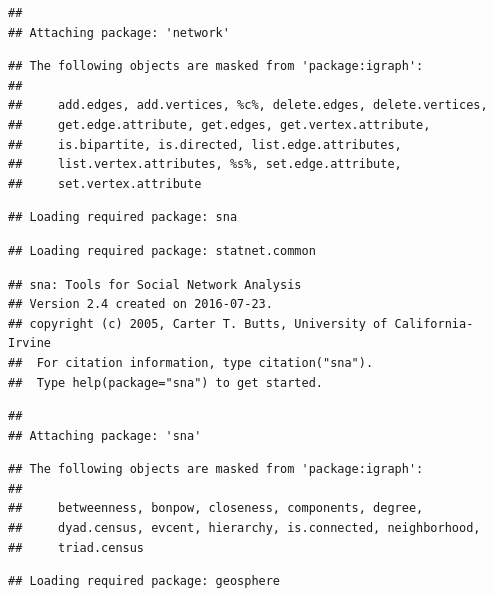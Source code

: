 \documentclass[]{article}
\begin{document}
\begin{verbatim}
## 
## Attaching package: 'network'
\end{verbatim}

\begin{verbatim}
## The following objects are masked from 'package:igraph':
## 
##     add.edges, add.vertices, %c%, delete.edges, delete.vertices,
##     get.edge.attribute, get.edges, get.vertex.attribute,
##     is.bipartite, is.directed, list.edge.attributes,
##     list.vertex.attributes, %s%, set.edge.attribute,
##     set.vertex.attribute
\end{verbatim}

\begin{verbatim}
## Loading required package: sna
\end{verbatim}

\begin{verbatim}
## Loading required package: statnet.common
\end{verbatim}

\begin{verbatim}
## sna: Tools for Social Network Analysis
## Version 2.4 created on 2016-07-23.
## copyright (c) 2005, Carter T. Butts, University of California-Irvine
##  For citation information, type citation("sna").
##  Type help(package="sna") to get started.
\end{verbatim}

\begin{verbatim}
## 
## Attaching package: 'sna'
\end{verbatim}

\begin{verbatim}
## The following objects are masked from 'package:igraph':
## 
##     betweenness, bonpow, closeness, components, degree,
##     dyad.census, evcent, hierarchy, is.connected, neighborhood,
##     triad.census
\end{verbatim}

\begin{verbatim}
## Loading required package: geosphere
\end{verbatim}
\end{document}
